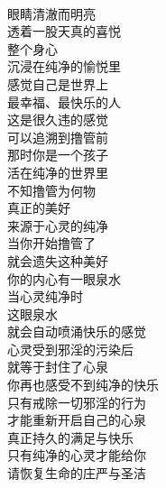 \begin{poem}[心泉]
    \begin{multicols}{3}
        \centering~\\
        眼睛清澈而明亮 \\ 透着一股天真的喜悦 \\ 整个身心 \\ 沉浸在纯净的愉悦里 \\ 感觉自己是世界上 \\ 最幸福、最快乐的人 \\ 这是很久违的感觉 \\ 可以追溯到撸管前 \\ 那时你是一个孩子 \\ 活在纯净的世界里 \\ 不知撸管为何物 \\ 真正的美好 \\ 来源于心灵的纯净 \\ 当你开始撸管了 \\ 就会遗失这种美好 \\ 你的内心有一眼泉水 \\ 当心灵纯净时 \\ 这眼泉水 \\ 就会自动喷涌快乐的感觉 \\ 心灵受到邪淫的污染后 \\ 就等于封住了心泉 \\ 你再也感受不到纯净的快乐 \\ 只有戒除一切邪淫的行为 \\ 才能重新开启自己的心泉 \\ 真正持久的满足与快乐 \\ 只有纯净的心灵才能给你 \\ 请恢复生命的庄严与圣洁
    \end{multicols}
\end{poem}

